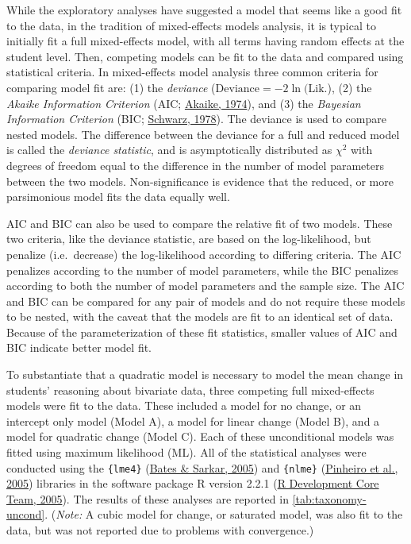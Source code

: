 \documentclass[11pt]{umnthesis}
\begin{document}
While the exploratory analyses have suggested a model that seems like a good fit to the data, in the tradition of mixed-effects models analysis, it is typical to initially fit a full mixed-effects model, with all terms having random effects at the student level. Then, competing models can be fit to the data and compared using statistical criteria. In mixed-effects model analysis three common criteria for comparing model fit are: (1) the \emph{deviance} (\(\mathrm{Deviance}=-2\ln(\mathrm{Lik.}\)), (2) the \emph{Akaike Information Criterion} (AIC; \protect\hyperlink{ref-akaike:1974}{Akaike, 1974}), and (3) the \emph{Bayesian Information Criterion} (BIC; \protect\hyperlink{ref-schwarz:1978}{Schwarz, 1978}). The deviance is used to compare nested models. The difference between the deviance for a full and reduced model is called the \emph{deviance statistic}, and is asymptotically distributed as \(\chi^2\) with degrees of freedom equal to the difference in the number of model parameters between the two models. Non-significance is evidence that the reduced, or more parsimonious model fits the data equally well.

AIC and BIC can also be used to compare the relative fit of two models. These two criteria, like the deviance statistic, are based on the log-likelihood, but penalize (i.e.~decrease) the log-likelihood according to differing criteria. The AIC penalizes according to the number of model parameters, while the BIC penalizes according to both the number of model parameters and the sample size. The AIC and BIC can be compared for any pair of models and do not require these models to be nested, with the caveat that the models are fit to an identical set of data. Because of the parameterization of these fit statistics, smaller values of AIC and BIC indicate better model fit.

To substantiate that a quadratic model is necessary to model the mean change in students' reasoning about bivariate data, three competing full mixed-effects models were fit to the data. These included a model for no change, or an intercept only model (Model A), a model for linear change (Model B), and a model for quadratic change (Model C). Each of these unconditional models was fitted using maximum likelihood (ML). All of the statistical analyses were conducted using the \texttt{\{lme4\}} (\protect\hyperlink{ref-bates:2005}{Bates \& Sarkar, 2005}) and \texttt{\{nlme\}} (\protect\hyperlink{ref-pinheiro:2005}{Pinheiro et al., 2005}) libraries in the software package R version 2.2.1 (\protect\hyperlink{ref-r-dev:2005}{R Development Core Team, 2005}). The results of these analyses are reported in \ref{tab:taxonomy-uncond}. (\emph{Note:} A cubic model for change, or saturated model, was also fit to the data, but was not reported due to problems with convergence.)
\end{document}
